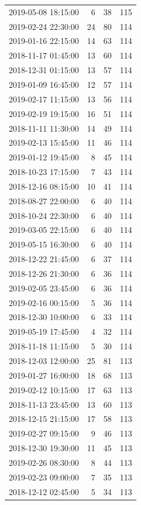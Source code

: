 \begin{tabular}{lrrr}
2019-05-08 18:15:00 & 6 & 38 & 115 \\
2019-02-24 22:30:00 & 24 & 80 & 114 \\
2019-01-16 22:15:00 & 14 & 63 & 114 \\
2018-11-17 01:45:00 & 13 & 60 & 114 \\
2018-12-31 01:15:00 & 13 & 57 & 114 \\
2019-01-09 16:45:00 & 12 & 57 & 114 \\
2019-02-17 11:15:00 & 13 & 56 & 114 \\
2019-02-19 19:15:00 & 16 & 51 & 114 \\
2018-11-11 11:30:00 & 14 & 49 & 114 \\
2019-02-13 15:45:00 & 11 & 46 & 114 \\
2019-01-12 19:45:00 & 8 & 45 & 114 \\
2018-10-23 17:15:00 & 7 & 43 & 114 \\
2018-12-16 08:15:00 & 10 & 41 & 114 \\
2018-08-27 22:00:00 & 6 & 40 & 114 \\
2018-10-24 22:30:00 & 6 & 40 & 114 \\
2019-03-05 22:15:00 & 6 & 40 & 114 \\
2019-05-15 16:30:00 & 6 & 40 & 114 \\
2018-12-22 21:45:00 & 6 & 37 & 114 \\
2018-12-26 21:30:00 & 6 & 36 & 114 \\
2019-02-05 23:45:00 & 6 & 36 & 114 \\
2019-02-16 00:15:00 & 5 & 36 & 114 \\
2018-12-30 10:00:00 & 6 & 33 & 114 \\
2019-05-19 17:45:00 & 4 & 32 & 114 \\
2018-11-18 11:15:00 & 5 & 30 & 114 \\
2018-12-03 12:00:00 & 25 & 81 & 113 \\
2019-01-27 16:00:00 & 18 & 68 & 113 \\
2019-02-12 10:15:00 & 17 & 63 & 113 \\
2018-11-13 23:45:00 & 13 & 60 & 113 \\
2018-12-15 21:15:00 & 17 & 58 & 113 \\
2019-02-27 09:15:00 & 9 & 46 & 113 \\
2018-12-30 19:30:00 & 11 & 45 & 113 \\
2019-02-26 08:30:00 & 8 & 44 & 113 \\
2019-02-23 09:00:00 & 7 & 35 & 113 \\
2018-12-12 02:45:00 & 5 & 34 & 113 \\

\end{tabular}
